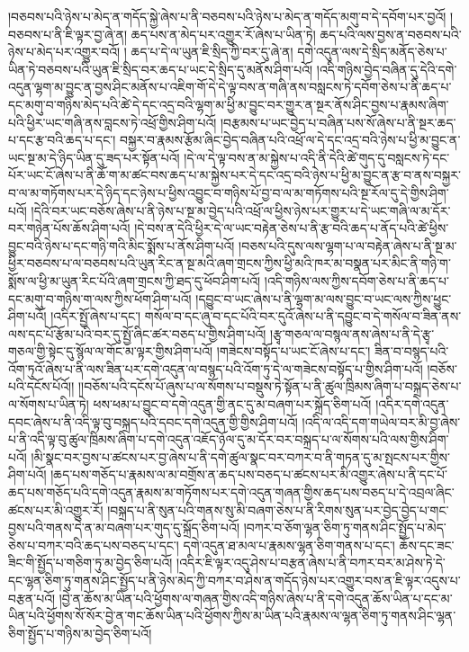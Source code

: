 །བཅབས་པའི་ཉེས་པ་མེད་ན་གདོད་སྐྱེ་ཞེས་པ་ནི་བཅབས་པའི་ཉེས་པ་མེད་ན་གདོད་མགུ་བ་དེ་དབོག་པར་བྱའོ། །བཅབས་པ་ནི་ཇི་ལྟར་བྱ་ཞེ་ན། ཆད་པས་ན་མེད་པར་འགྱུར་རོ་ཞེས་པ་ཡིན་ཏེ། ཆད་པའི་ལས་བྱས་ན་བཅབས་པའི་ཉེས་པ་མེད་པར་འགྱུར་བའོ། །
ཆད་པ་དེ་ལ་ཡུན་ཇི་སྲིད་ཀྱི་བར་དུ་ཞེ་ན། དགེ་འདུན་ལས་དེ་སྲིད་མནོད་ཅེས་པ་ཡིན་ཏེ་བཅབས་པའི་ཡུན་ཇི་སྲིད་བར་ཆད་པ་ཡང་དེ་སྲིད་དུ་མནོས་ཤིག་པའོ། །འདི་གཉིས་བྱེད་བཞིན་དུ་དེའི་དགེ་འདུན་ལྷག་མ་བྱུང་ན་བྱས་ཤིང་མནོས་པ་འཇིག་གོ་དེ་དེ་ལྟ་བས་ན་གཞི་ནས་བསླངས་ཏེ་དབོག་ཅེས་པ་ནི་ཆད་པ་དང་མགུ་བ་གཉིས་མེད་པའི་ཚེ་དེ་དང་འདྲ་བའི་ལྷག་མ་ཕྱི་མ་བྱུང་བར་གྱུར་ན་སྔར་ནོས་ཤིང་བྱས་པ་རྣམས་ཞིག་པའི་ཕྱིར་ཡང་གཞི་ནས་བླངས་ཏེ་འཕྲོ་གྱིས་ཤིག་པའོ། །བརྩམས་པ་ཡང་བྱེད་པ་བཞིན་པས་སོ་ཞེས་པ་ནི་སྔར་ཆད་པ་དང་རྩ་བའི་ཆད་པ་དང་། བསྐྱར་བ་རྣམས་རྩོམ་ཞིང་བྱེད་བཞིན་པའི་འཕྲོ་ལ་དེ་དང་འདྲ་བའི་ཉེས་པ་ཕྱི་མ་བྱུང་ན་ཡང་སྔ་མ་དེ་ཉིད་ཡིན་དུ་ཟད་པར་སྟོན་པའོ། །དེ་ལ་དེ་ལྟ་བས་ན་མ་སྐྱེས་པ་འདི་ནི་དེའི་ཚེ་གུད་དུ་བསླངས་ཏེ་དང་པོར་ཡང་ངོ་ཞེས་པ་ནི་ཆོ་ག་མ་ཚང་བས་ཆད་པ་མ་སྐྱེས་པར་དེ་དང་འདྲ་བའི་ཉེས་པ་ཕྱི་མ་བྱུང་ན་རྩ་བ་ནས་བསྐྱར་བ་ལ་མ་གཏོགས་པར་དེ་ཉིད་དང་ཉེས་པ་ཕྱིས་འབྱུང་བ་གཉིས་པོ་བྱ་བ་ལ་མ་གཏོགས་པའི་སྔ་རོལ་དུ་དེ་གྱིས་ཤིག་པའོ། །དེའི་བར་ཡང་བཅོས་ཞེས་པ་ནི་ཉེས་པ་སྔ་མ་བྱེད་པའི་འཕྲོ་ལ་ཕྱིས་ཉེས་པར་གྱུར་པ་དེ་ཡང་གཞི་ལ་མ་དོར་བར་གཉེན་པོས་ཆོས་ཤིག་པའོ། །དེ་བས་ན་དེའི་ཕྱིར་དེ་ལ་ཡང་བརྟེན་ཅེས་པ་ནི་རྩ་བའི་ཆད་པ་ནོད་པའི་ཚེ་ཕྱིས་བྱུང་བའི་ཉེས་པ་དང་གཉི་གའི་མིང་སྨོས་པ་ནོས་ཤིག་པའོ། །བཅས་པའི་དུས་ལས་ལྷག་པ་ལ་བརྟེན་ཞེས་པ་ནི་སྔ་མ་ཕྱིར་བཅབས་པ་ལ་བཅབས་པའི་ཡུན་རིང་ན་སྔ་མའི་ཞག་གྲངས་ཀྱིས་ཕྱི་མའི་ཁར་མ་བསྣན་པར་མིང་ནི་གཉི་ག་སྨོས་ལ་ཕྱི་མ་ཡུན་རིང་པོའི་ཞག་གྲངས་ཀྱི་ཐད་དུ་ཕོབ་ཤིག་པའོ། །འདི་གཉིས་ལས་ཀྱིས་དབོག་ཅེས་པ་ནི་ཆད་པ་དང་མགུ་བ་གཉིས་ག་ལས་ཀྱིས་ཕོག་ཤིག་པའོ། །དབྱུང་བ་ཡང་ཞེས་པ་ནི་ལྷག་མ་ལས་བྱུང་བ་ཡང་ལས་ཀྱིས་ཕྱུང་ཤིག་པའོ། །འདིར་སྤྱོ་ཞེས་པ་དང་། གསོལ་བ་དང་ཞུ་བ་དང་པོའི་བར་དུའོ་ཞེས་པ་ནི་དབྱུང་བ་དེ་གསོལ་བ་ཟིན་ནས་ལས་དང་པོ་རྩོམ་པའི་བར་དུ་སྤྱོ་ཞིང་ཚར་བཅད་པ་གྱིས་ཤིག་པའོ། །རྩྭ་གཅལ་ལ་བསྙལ་ནས་ཞེས་པ་ནི་དེ་རྩྭ་གཅལ་གྱི་སྟེང་དུ་སྙོལ་ལ་གོང་མ་ལྟར་གྱིས་ཤིག་པའོ། །གཟེངས་བསྟོད་པ་ཡང་ངོ་ཞེས་པ་དང་། ཟིན་བ་བསྙད་པའི་འོག་ཏུའོ་ཞེས་པ་ནི་ལས་ཟིན་པར་དགེ་འདུན་ལ་བསྙད་པའི་འོག་ཏུ་དེ་ལ་གཟེངས་བསྟོད་པ་གྱིས་ཤིག་པའོ། །བཅོས་པའི་དངོས་པོའོ།། །།བཅོས་པའི་དངོས་པོ་ཞུས་པ་ལ་སོགས་པ་བསྡུས་ཏེ་སྟོན་པ་ནི་ཚུལ་ཁྲིམས་ཞིག་པ་བསྐྲད་ཅེས་པ་ལ་སོགས་པ་ཡིན་ཏེ། ཕས་ཕམ་པ་བྱུང་བ་དགེ་འདུན་གྱི་ནང་དུ་མ་བཞག་པར་སྐྲོད་ཅིག་པའོ། །འདིར་དགེ་འདུན་དབང་ཞེས་པ་ནི་འདི་ལྟ་བུ་བསྐྲད་པའི་དབང་དགེ་འདུན་གྱི་གྱིས་ཤིག་པའོ། །འདི་ལ་འདི་དག་གཡེལ་བར་མི་བྱ་ཞེས་པ་ནི་འདི་ལྟ་བུ་ཚུལ་ཁྲིམས་ཞིག་པ་དགེ་འདུན་འཇོད་ཉོལ་དུ་མ་དོར་བར་བསྐྲད་པ་ལ་སོགས་པའི་ལས་གྱིས་ཤིག་པའོ། །མི་སྣང་བར་བྱས་པ་ཚངས་པར་བྱ་ཞེས་པ་ནི་དགེ་ཚུལ་སྣང་བར་བཀར་བ་ནི་གཏན་དུ་མ་སྤངས་པར་གྱིས་ཤིག་པའོ། །ཆད་པས་གཅོད་པ་རྣམས་ལ་མ་བགྲོས་ན་ཆད་པས་བཅད་པ་ཚངས་པར་མི་འགྱུར་ཞེས་པ་ནི་དང་པོ་ཆད་པས་གཅོད་པའི་དགེ་འདུན་རྣམས་མ་གཏོགས་པར་དགེ་འདུན་གཞན་གྱིས་ཆད་པས་བཅད་པ་དེ་འབྲལ་ཞིང་ཚངས་པར་མི་འགྱུར་རོ། །བསྐྲད་པ་ནི་སུན་པའི་གནས་སུ་མི་བཞག་ཅེས་པ་ནི་རིགས་སུན་པར་བྱེད་བྱེད་པ་གང་བྱས་པའི་གནས་དེ་ན་མ་བཞག་པར་གུད་དུ་སྐྲོད་ཅིག་པའོ། །བཀར་བ་ཅོག་ལྷན་ཅིག་ཏུ་གནས་ཤིང་སྤྱོད་པ་མེད་ཅེས་པ་བཀར་བའི་ཆད་པས་བཅད་པ་དང་། དགེ་འདུན་ཐ་མལ་པ་རྣམས་ལྷན་ཅིག་གནས་པ་དང་། ཆོས་དང་ཟང་ཟིང་གི་སྤྱོད་པ་གཅིག་ཏུ་མ་བྱེད་ཅིག་པའོ། །འདིར་ཇི་ལྟར་འདུ་ཤེས་པ་བརྩན་ཞེས་པ་ནི་བཀར་བར་མ་ཤེས་ཏེ་དེ་དང་ལྷན་ཅིག་ཏུ་གནས་ཤིང་སྤྱོད་པ་ནི་ཉེས་མེད་ཀྱི་བཀར་བ་ཤེས་ན་གདོད་ཉེས་པར་འགྱུར་བས་ན་ཇི་ལྟར་འདུས་པ་བརྩན་པའོ། །བྱེ་ན་ཆོས་མ་ཡིན་པའི་ཕྱོགས་ལ་གཞན་གྱིས་འདི་གཉིས་ཞེས་པ་ནི་དགེ་འདུན་ཆོས་ཡིན་པ་དང་མ་ཡིན་པའི་ཕྱོགས་སོ་སོར་བྱེ་ན་གང་ཆོས་ཡིན་པའི་ཕྱོགས་ཀྱིས་མ་ཡིན་པའི་རྣམས་ལ་ལྷན་ཅིག་ཏུ་གནས་ཤིང་ལྷན་ཅིག་སྤྱོད་པ་གཉིས་མ་བྱེད་ཅིག་པའོ། 